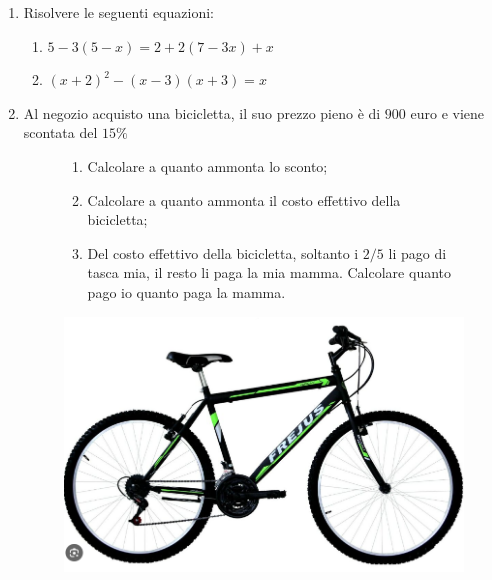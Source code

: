 \documentclass[14pt]{extarticle}
\begin{document}
\begin{enumerate}[label=\bfseries\arabic*)]
		\item Risolvere le seguenti equazioni:
		\begin{enumerate}
			\item 
				$
					5 -3(5 - x) = 2 + 2\left( 7 - 3x \right) + x
				$
			\item 
				$
					(x + 2)^2 - (x - 3)(x+3) = x
				$
		\end{enumerate}
		
		
		




		\item Al negozio acquisto una bicicletta, il suo prezzo pieno è di $900$ euro e viene scontata del $15\%$
		




		\begin{figure}[h]
		    \begin{minipage}{0.6\textwidth}
				\begin{enumerate}
			    		\item Calcolare a quanto ammonta lo sconto;
			    		\item Calcolare a quanto ammonta il costo effettivo della bicicletta;
			    		\item Del costo effettivo della bicicletta, soltanto i $2/5$ li pago di tasca mia, il resto li paga la mia mamma. Calcolare quanto pago io quanto paga la mamma.
				\end{enumerate}
		    \end{minipage}
		    \hfill
		    \begin{minipage}{0.3\textwidth}
				\centering
				\includegraphics[width=\textwidth]{bicicletta.png} %
		    \end{minipage}
		\end{figure}





\end{enumerate}
\end{document}
